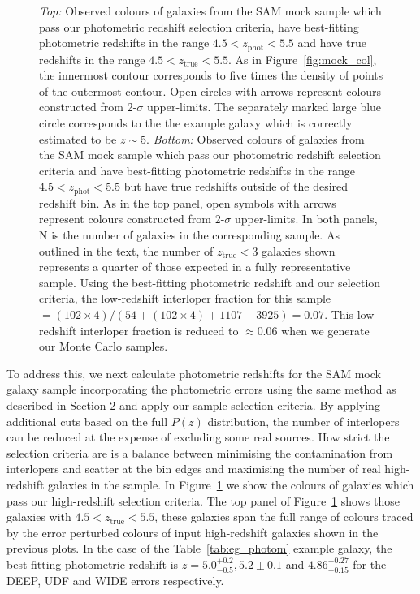 \begin{figure}
\caption[Observed colours of galaxies from the SAM mock sample which pass our photometric redshift selection criteria. ]{\emph{Top:} Observed colours of galaxies from the SAM mock sample which pass our photometric redshift selection criteria, have best-fitting photometric redshifts in the range $4.5 < z_{\text{phot}} < 5.5$ and have true redshifts in the range $4.5 < z_{\text{true}} < 5.5$. As in Figure~\ref{fig:mock_col}, the innermost contour corresponds to five times the density of points of the outermost contour. Open circles with arrows represent colours constructed from 2-$\sigma$ upper-limits. The separately marked large blue circle corresponds to the the example galaxy which is correctly estimated to be $z \sim 5$. \emph{Bottom:} Observed colours of galaxies from the SAM mock sample which pass our photometric redshift selection criteria and have best-fitting photometric redshifts in the range $4.5 < z_{\text{phot}} < 5.5$ but have true redshifts outside of the desired redshift bin. As in the top panel, open symbols with arrows represent colours constructed from 2-$\sigma$ upper-limits. In both panels, N is the number of galaxies in the corresponding sample. As outlined in the text, the number of $z_{\text{true}} < 3$ galaxies shown represents a quarter of those expected in a fully representative sample. Using the best-fitting photometric redshift and our selection criteria, the low-redshift interloper fraction for this sample $= (102 \times 4) / (54 + (102 \times 4) + 1107 + 3925) = 0.07$. This low-redshift interloper fraction is reduced to $\approx 0.06$ when we generate our Monte Carlo samples.}
\label{fig:mock_col_photz}
\end{figure}

To address this, we next calculate photometric redshifts for the SAM mock galaxy sample incorporating the photometric errors using the same method as described in Section 2 and apply our sample selection criteria. By applying additional cuts based on the full $P(z)$ distribution, the number of interlopers can be reduced at the expense of excluding some real sources.  How strict the selection criteria are is a balance between minimising the contamination from interlopers and scatter at the bin edges and maximising the number of real high-redshift galaxies in the sample. In Figure~\ref{fig:mock_col_photz} we show the colours of galaxies which pass our high-redshift selection criteria. The top panel of Figure~\ref{fig:mock_col_photz} shows those galaxies with $4.5 < z_{\text{true}} < 5.5$, these galaxies span the full range of colours traced by the error perturbed colours of input high-redshift galaxies shown in the previous plots. In the case of the Table~\ref{tab:eg_photom} example galaxy, the best-fitting photometric redshift is $z = 5.0^{+0.2}_{-0.5}, 5.2\pm0.1$ and $4.86^{+0.27}_{-0.15}$ for the DEEP, UDF and WIDE errors respectively. 

